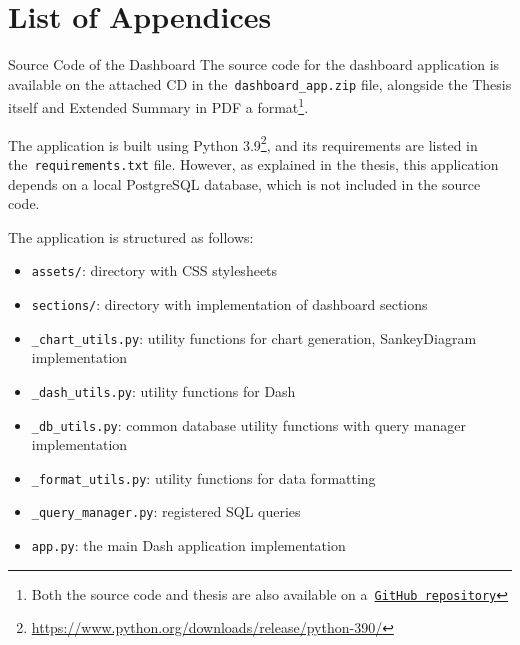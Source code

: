 \appendix
{}
\chapter*{List of Appendices}
\renewcommand{\thesection}{Appendix \Alph{section}}

\begin{section}{Source Code of the Dashboard}
	\label{appendix:source-code}
	The source code for the dashboard application is available on the attached CD in the~\texttt{dashboard\_app.zip} file,
	alongside the Thesis itself and Extended Summary in PDF a format\footnote{Both the source code and thesis are also available on a~\href{https://github.com/filipditrich/master-thesis}{\texttt{GitHub repository}}}.

	The application is built using Python 3.9\footnote{\url{https://www.python.org/downloads/release/python-390/}}, and its requirements are listed in the~\texttt{requirements.txt} file.
	However, as explained in the thesis, this application depends on a local PostgreSQL database, which is not included in the source code.

	The application is structured as follows:
	\begin{itemize}
		\item \texttt{assets/}: directory with CSS stylesheets
		\item \texttt{sections/}: directory with implementation of dashboard sections
		\item \texttt{\_chart\_utils.py}: utility functions for chart generation, SankeyDiagram implementation
		\item \texttt{\_dash\_utils.py}: utility functions for Dash
		\item \texttt{\_db\_utils.py}: common database utility functions with query manager implementation
		\item \texttt{\_format\_utils.py}: utility functions for data formatting
		\item \texttt{\_query\_manager.py}: registered SQL queries
		\item \texttt{app.py}: the main Dash application implementation
	\end{itemize}

\end{section}